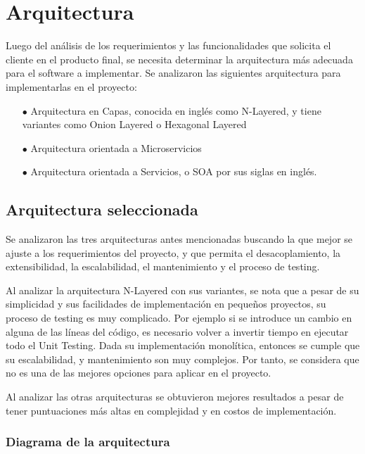 \chapter{Arquitectura}

Luego del análisis de los requerimientos y las funcionalidades que solicita el cliente en el producto final, se necesita determinar la arquitectura más adecuada para el software a implementar. Se analizaron las siguientes arquitectura para implementarlas en el proyecto:

\begin{enumerate}
    \item[$\bullet$] Arquitectura en Capas, conocida en inglés como N-Layered, y tiene variantes como Onion Layered o Hexagonal Layered
    \item[$\bullet$] Arquitectura orientada a Microservicios
    \item[$\bullet$] Arquitectura orientada a Servicios, o SOA por sus siglas en inglés.
\end{enumerate}

\section{Arquitectura seleccionada}\label{sec:arch}

Se analizaron las tres arquitecturas antes mencionadas buscando la que mejor se ajuste a los requerimientos del proyecto, y que permita el desacoplamiento, la extensibilidad, la escalabilidad, el mantenimiento y el proceso de testing. 

Al analizar la arquitectura N-Layered con sus variantes, se nota que a pesar de su simplicidad y sus facilidades de implementación en pequeños proyectos, su proceso de testing es muy complicado. Por ejemplo si se introduce un cambio en alguna de las líneas del código, es necesario volver a invertir tiempo en ejecutar todo el Unit Testing. Dada su implementación monolítica, entonces se cumple que su escalabilidad, y mantenimiento son muy complejos. Por tanto, se considera que no es una de las mejores opciones para aplicar en el proyecto.

Al analizar las otras arquitecturas se obtuvieron mejores resultados a pesar de tener puntuaciones más altas en complejidad y en costos de implementación.

\subsection{Diagrama de la arquitectura}\label{sec:diagrmaArch}

